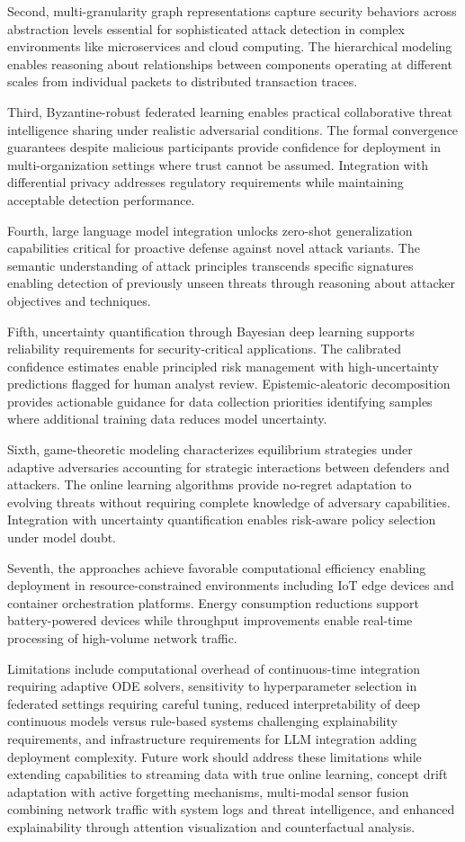 Second, multi-granularity graph representations capture security behaviors across abstraction levels essential for sophisticated attack detection in complex environments like microservices and cloud computing. The hierarchical modeling enables reasoning about relationships between components operating at different scales from individual packets to distributed transaction traces.

Third, Byzantine-robust federated learning enables practical collaborative threat intelligence sharing under realistic adversarial conditions. The formal convergence guarantees despite malicious participants provide confidence for deployment in multi-organization settings where trust cannot be assumed. Integration with differential privacy addresses regulatory requirements while maintaining acceptable detection performance.

Fourth, large language model integration unlocks zero-shot generalization capabilities critical for proactive defense against novel attack variants. The semantic understanding of attack principles transcends specific signatures enabling detection of previously unseen threats through reasoning about attacker objectives and techniques.

Fifth, uncertainty quantification through Bayesian deep learning supports reliability requirements for security-critical applications. The calibrated confidence estimates enable principled risk management with high-uncertainty predictions flagged for human analyst review. Epistemic-aleatoric decomposition provides actionable guidance for data collection priorities identifying samples where additional training data reduces model uncertainty.

Sixth, game-theoretic modeling characterizes equilibrium strategies under adaptive adversaries accounting for strategic interactions between defenders and attackers. The online learning algorithms provide no-regret adaptation to evolving threats without requiring complete knowledge of adversary capabilities. Integration with uncertainty quantification enables risk-aware policy selection under model doubt.

Seventh, the approaches achieve favorable computational efficiency enabling deployment in resource-constrained environments including IoT edge devices and container orchestration platforms. Energy consumption reductions support battery-powered devices while throughput improvements enable real-time processing of high-volume network traffic.

Limitations include computational overhead of continuous-time integration requiring adaptive ODE solvers, sensitivity to hyperparameter selection in federated settings requiring careful tuning, reduced interpretability of deep continuous models versus rule-based systems challenging explainability requirements, and infrastructure requirements for LLM integration adding deployment complexity. Future work should address these limitations while extending capabilities to streaming data with true online learning, concept drift adaptation with active forgetting mechanisms, multi-modal sensor fusion combining network traffic with system logs and threat intelligence, and enhanced explainability through attention visualization and counterfactual analysis.

